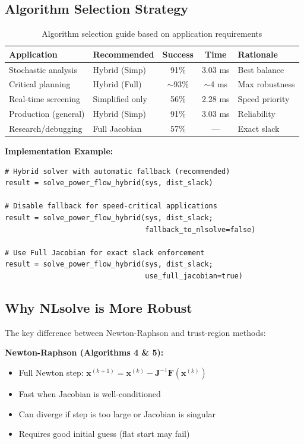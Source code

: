 \documentclass[11pt]{article}
\begin{document}
\subsection{Algorithm Selection Strategy}

\begin{table}[h]
\centering
\begin{tabular}{l|l|c|c|l}
\hline
Application & Recommended & Success & Time & Rationale \\
\hline
Stochastic analysis & Hybrid (Simp) & 91\% & 3.03 ms & Best balance \\
Critical planning & Hybrid (Full) & $\sim$93\% & $\sim$4 ms & Max robustness \\
Real-time screening & Simplified only & 56\% & 2.28 ms & Speed priority \\
Production (general) & Hybrid (Simp) & 91\% & 3.03 ms & Reliability \\
Research/debugging & Full Jacobian & 57\% & --- & Exact slack \\
\hline
\end{tabular}
\caption{Algorithm selection guide based on application requirements}
\end{table}

\textbf{Implementation Example:}
\begin{verbatim}
# Hybrid solver with automatic fallback (recommended)
result = solve_power_flow_hybrid(sys, dist_slack)

# Disable fallback for speed-critical applications
result = solve_power_flow_hybrid(sys, dist_slack; 
                                 fallback_to_nlsolve=false)

# Use Full Jacobian for exact slack enforcement
result = solve_power_flow_hybrid(sys, dist_slack; 
                                 use_full_jacobian=true)
\end{verbatim}

\subsection{Why NLsolve is More Robust}

The key difference between Newton-Raphson and trust-region methods:

\textbf{Newton-Raphson (Algorithms 4 \& 5):}
\begin{itemize}
    \item Full Newton step: $\mathbf{x}^{(k+1)} = \mathbf{x}^{(k)} - \mathbf{J}^{-1} \mathbf{F}(\mathbf{x}^{(k)})$
    \item Fast when Jacobian is well-conditioned
    \item Can diverge if step is too large or Jacobian is singular
    \item Requires good initial guess (flat start may fail)
\end{itemize}
\end{document}
